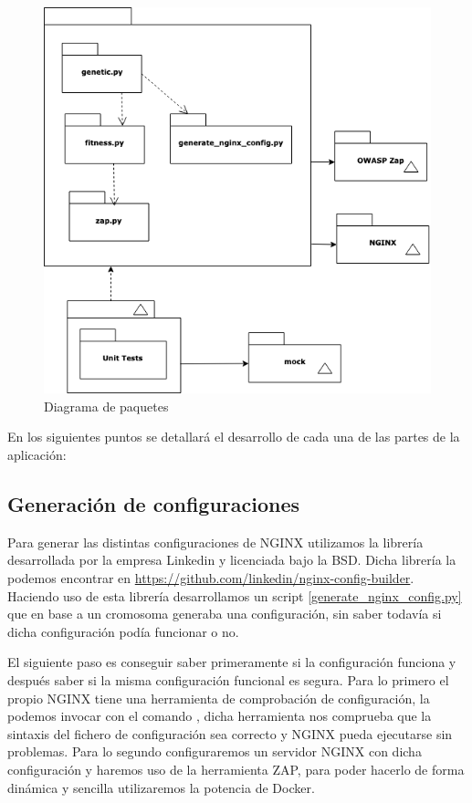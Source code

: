 \begin{figure}[H]
\centering
\includegraphics[width=1.0\textwidth]{../images/diagrama_2}
\caption{Diagrama de paquetes}
\label{fig:diagrama_2}
\end{figure}

En los siguientes puntos se detallará el desarrollo de cada una de las partes de la aplicación:

\subsection{Generación de configuraciones}

\bigskip
Para generar las distintas configuraciones de NGINX utilizamos la librería  desarrollada por la empresa Linkedin y licenciada bajo la BSD. Dicha librería la podemos encontrar en \url{https://github.com/linkedin/nginx-config-builder}. Haciendo uso de esta librería desarrollamos un script \ref{generate_nginx_config.py} que en base a un cromosoma generaba una configuración, sin saber todavía si dicha configuración podía funcionar o no.

\bigskip
El siguiente paso es conseguir saber primeramente si la configuración funciona y después saber si la misma configuración funcional es segura. Para lo primero el propio NGINX tiene una herramienta de comprobación de configuración, la podemos invocar con el comando , dicha herramienta nos comprueba que la sintaxis del fichero de configuración sea correcto y NGINX pueda ejecutarse sin problemas. Para lo segundo configuraremos un servidor NGINX con dicha configuración y haremos uso de la herramienta ZAP, para poder hacerlo de forma dinámica y sencilla utilizaremos la potencia de Docker.

